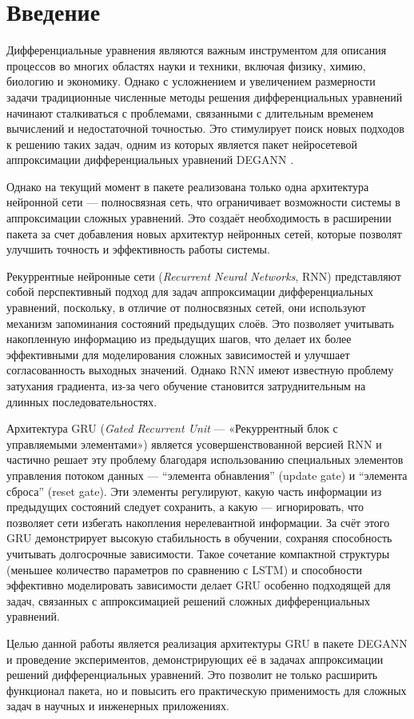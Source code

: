 
\section*{Введение}
\thispagestyle{withCompileDate}

Дифференциальные уравнения являются важным инструментом для описания процессов во многих областях науки и техники, включая физику, химию, биологию и экономику. Однако с усложнением и увеличением размерности задачи традиционные численные методы решения дифференциальных уравнений начинают сталкиваться с проблемами, связанными с длительным временем вычислений и недостаточной точностью. Это стимулирует поиск новых подходов к решению таких задач, одним из которых является пакет нейросетевой аппроксимации дифференциальных уравнений DEGANN \cite{degann}.

Однако на текущий момент в пакете реализована только одна архитектура нейронной сети — полносвязная сеть, что ограничивает возможности системы в аппроксимации сложных уравнений. Это создаёт необходимость в расширении пакета за счет добавления новых архитектур нейронных сетей, которые позволят улучшить точность и эффективность работы системы.

Рекуррентные нейронные сети (\textit{Recurrent Neural Networks}, RNN\cite{IBM_RNN}) представляют собой перспективный подход для задач аппроксимации дифференциальных уравнений, поскольку, в отличие от полносвязных сетей, они используют механизм запоминания состояний предыдущих слоёв. Это позволяет учитывать накопленную информацию из предыдущих шагов, что делает их более эффективными для моделирования сложных зависимостей и улучшает согласованность выходных значений. Однако RNN имеют известную проблему затухания градиента, из-за чего обучение становится затруднительным на длинных последовательностях.

Архитектура GRU (\textit{Gated Recurrent Unit} --- «Рекуррентный блок с управляемыми элементами»\cite{gru}) является усовершенствованной версией RNN и частично решает эту проблему благодаря использованию специальных элементов управления потоком данных — “элемента обнавления” (update gate) и “элемента сброса” (reset gate). Эти элементы регулируют, какую часть информации из предыдущих состояний следует сохранить, а какую — игнорировать, что позволяет сети избегать накопления нерелевантной информации. За счёт этого GRU демонстрирует высокую стабильность в обучении, сохраняя способность учитывать долгосрочные зависимости. Такое сочетание компактной структуры (меньшее количество параметров по сравнению с LSTM\cite{lstm}) и способности эффективно моделировать зависимости делает GRU особенно подходящей для задач, связанных с аппроксимацией решений сложных дифференциальных уравнений.

Целью данной работы является реализация архитектуры GRU в пакете DEGANN\cite{degann} и проведение экспериментов, демонстрирующих её в задачах аппроксимации решений дифференциальных уравнений. Это позволит не только расширить функционал пакета, но и повысить его практическую применимость для сложных задач в научных и инженерных приложениях.
